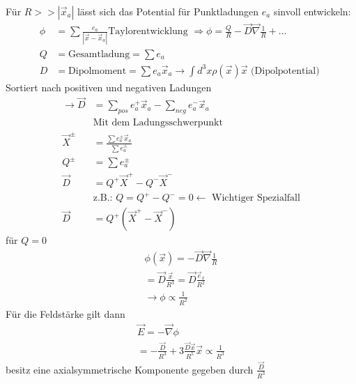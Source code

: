 \documentclass[a4paper]{article}
\begin{document}
Für $R>>|\vec{x}_a|$ lässt sich das Potential für Punktladungen $e_a$ sinvoll
entwickeln:
\begin{align}
\phi&=\sum\frac{e_a}{|\vec{x}-\vec{x}_a|}
\text{Taylorentwicklung } \Rightarrow \phi=\frac{Q}{R}-
\vec{D}\vec{\nabla}\frac{1}{R}+\ldots\\
Q&=\text{Gesamtladung}=\sum e_a\\
D&=\text{Dipolmoment}=\sum e_a \vec{x}_a \rightarrow \int
d^3x\rho(\vec{x})\vec{x} \text{  (Dipolpotential)  }
\end{align}
Sortiert nach positiven und negativen Ladungen
\begin{align}
\rightarrow \vec{D}&=\sum_{pos} e_a^+\vec{x}_a-\sum_{neg} e_a^-\vec{x}_a\\
&\text{Mit dem Ladungsschwerpunkt}\\
\vec{X}^\pm&=\frac{\sum e^\pm_a\vec{x}_a}{\sum e^\pm_a}\\
Q^\pm&=\sum e^\pm_a\\
\vec{D}&=Q^+\vec{X}^+-Q^-\vec{X}^-\\
&\text{z.B.: }Q=Q^+-Q^-=0 \leftarrow \text{ Wichtiger Spezialfall}\\
\vec{D}&=Q^+(\vec{X}^+-\vec{X}^-)
\end{align} 
für $Q=0$
\begin{align}
\phi(\vec{x})=-\vec{D}\vec{\nabla}\frac{1}{R}\\
=\vec{D}\frac{\vec{x}}{R^3}=\vec{D}\frac{\vec{e}_x}{R^2}\\
\rightarrow \phi \propto \frac{1}{R^2}
\end{align}
Für die Feldstärke gilt dann
\begin{align}
\vec{E}=-\vec{\nabla}\phi\\
=-\frac{\vec{D}}{R^3}+3\frac{\vec{D}\vec{x}}{R^5}\vec{x}\propto \frac{1}{R^3}
\end{align}
besitz eine axialsymmetrische Komponente gegeben durch $\frac{\vec{D}}{R^3}$
\end{document}
